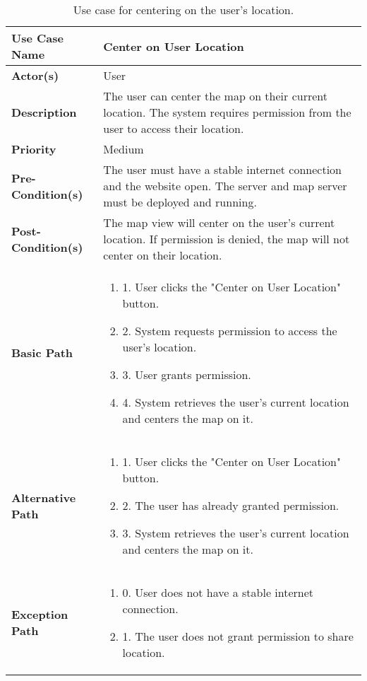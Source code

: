 \begin{table}[h]
    \centering
    \renewcommand{\arraystretch}{1.5}
    \begin{tabularx}{\textwidth}{|l|X|}
        \hline
        \rowcolor{gray!20}
        \textbf{Use Case Name} & Center on User Location \\
        \hline
        \textbf{Actor(s)} & User \\
        \hline
        \textbf{Description} & The user can center the map on their current location. The system requires permission from the user to access their location. \\
        \hline
        \textbf{Priority} & Medium \\
        \hline
        \textbf{Pre-Condition(s)} & The user must have a stable internet connection and the website open. The server and map server must be deployed and running. \\
        \hline
        \textbf{Post-Condition(s)} & The map view will center on the user's current location. If permission is denied, the map will not center on their location. \\
        \hline
        \textbf{Basic Path} &  
        \begin{enumerate}[label=,left=0pt]
            \item 1. User clicks the "Center on User Location" button.
            \item 2. System requests permission to access the user's location.
            \item 3. User grants permission.
            \item 4. System retrieves the user's current location and centers the map on it.
        \end{enumerate} \\
        \hline
        \textbf{Alternative Path} & 
        \begin{enumerate}[label=,left=0pt]
            \item 1. User clicks the "Center on User Location" button.
            \item 2. The user has already granted permission.
            \item 3. System retrieves the user's current location and centers the map on it.
        \end{enumerate} \\
        \hline
        \textbf{Exception Path} & 
        \begin{enumerate}[label=,left=0pt]
            \item 0. User does not have a stable internet connection.
            \item 1. The user does not grant permission to share location.
        \end{enumerate} \\
        \hline
    \end{tabularx}
    \caption[Use Case Specification: Center on User Location]{Use case for centering on the user's location.}
    \label{tab:use_case_center_location_appendix}
\end{table}



